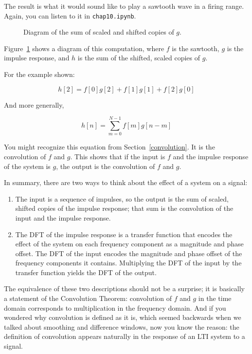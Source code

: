 \documentclass[12pt]{book}
\begin{document}
The result is what it would sound like to play a sawtooth wave in a
firing range.  Again, you can listen to it in {\tt chap10.ipynb}.

\begin{figure}

\caption{Diagram of the sum of scaled and shifted copies of $g$.}
\label{fig.convolution}
\end{figure}

Figure~\ref{fig.convolution} shows a diagram of this computation,
where $f$ is the sawtooth, $g$ is the impulse response, and $h$
is the sum of the shifted, scaled copies of $g$.

For the example shown:

\[ h[2] = f[0]g[2] + f[1]g[1] + f[2]g[0]  \]

And more generally,

\[ h[n] = \sum_{m=0}^{N-1} f[m] g[n-m]  \]

You might recognize this equation from Section~\ref{convolution}.  It
is the convolution of $f$ and $g$.  This shows that if the input is $f$
and the impulse response of the system is $g$, the output is the
convolution of $f$ and $g$.

In summary, there are two ways to think about the effect of a system
on a signal:

\begin{enumerate}

\item The input is a sequence of impulses, so the output is the sum of
  scaled, shifted copies of the impulse response; that sum is the
  convolution of the input and the impulse response.

\item The DFT of the impulse response is a transfer function that
  encodes the effect of the system on each frequency component as a
  magnitude and phase offset.  The DFT of the input encodes the
  magnitude and phase offset of the frequency components it contains.
  Multiplying the DFT of the input by the transfer function yields
  the DFT of the output.

\end{enumerate}

The equivalence of these two descriptions should not be a surprise;
it is basically a statement of the Convolution Theorem:
convolution of $f$ and $g$ in the time
domain corresponds to multiplication in the frequency domain.
And if you wondered why convolution is defined as it is, which
seemed backwards when we talked about smoothing and difference
windows, now you know the reason: the definition of convolution
appears naturally in the response of an LTI system to a signal.
\end{document}
